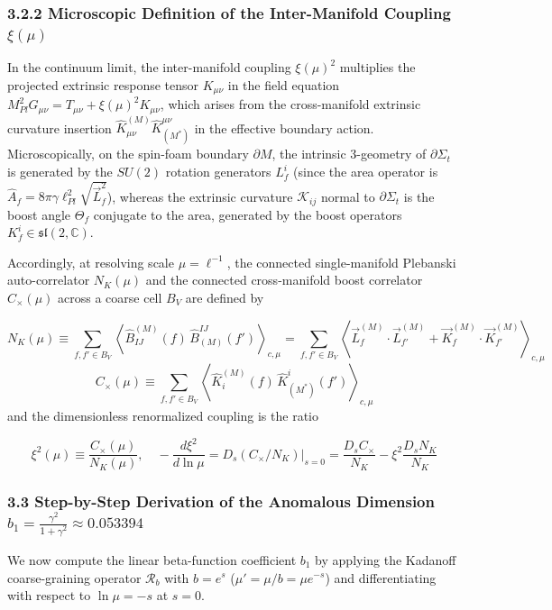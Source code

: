 \documentclass[aps,prd,onecolumn,superscriptaddress,nofootinbib,longbibliography,10pt]{revtex4-2}
\begin{document}
{{  
\subsubsection*{3.2.2 Microscopic Definition of the Inter-Manifold Coupling \(\xi(\mu)\)}

  In the continuum limit, the inter-manifold coupling \(\xi(\mu)^2\) multiplies the projected extrinsic response tensor \(K_{\mu\nu}\) in the field equation \(M_{Pl}^2 G_{\mu\nu} = T_{\mu\nu} + \xi(\mu)^2 K_{\mu\nu}\), which arises from the cross-manifold extrinsic curvature insertion \(\hat{K}_{\mu\nu}^{(M)}\hat{K}_{(M^*)}^{\mu\nu}\) in the effective boundary action. Microscopically, on the spin-foam boundary \(\partial M\), the intrinsic 3-geometry of \(\partial\Sigma_t\) is generated by the \(SU(2)\) rotation generators \(L_f^i\) (since the area operator is \(\hat{A}_f = 8\pi\gamma\ell_{Pl}^2\sqrt{\vec{L}_f^2}\)), whereas the extrinsic curvature \(\mathcal{K}_{ij}\) normal to \(\partial\Sigma_t\) is the boost angle \(\Theta_f\) conjugate to the area, generated by the boost operators \(K_f^i \in \mathfrak{sl}(2,\mathbb{C})\).


  Accordingly, at resolving scale \(\mu = \ell^{-1}\), the connected single-manifold Plebanski auto-correlator \(N_K(\mu)\) and the connected cross-manifold boost correlator \(C_\times(\mu)\) across a coarse cell \(B_V\) are defined by


  \[ N_K(\mu) \equiv \sum_{f,f'\in B_V} \left\langle \hat{B}_{IJ}^{(M)}(f)\,\hat{B}_{(M)}^{IJ}(f') \right\rangle_{c,\mu} = \sum_{f,f'\in B_V} \left\langle \vec{L}_f^{(M)}\cdot\vec{L}_{f'}^{(M)} + \vec{K}_f^{(M)}\cdot\vec{K}_{f'}^{(M)} \right\rangle_{c,\mu} \]
  \[ C_\times(\mu) \equiv \sum_{f,f'\in B_V} \left\langle \hat{K}_i^{(M)}(f)\,\hat{K}_{(M^*)}^i(f') \right\rangle_{c,\mu} \]
  and the dimensionless renormalized coupling is the ratio


  \[ \xi^2(\mu) \equiv \frac{C_\times(\mu)}{N_K(\mu)}, \quad -\frac{d\xi^2}{d\ln\mu} = \left. D_s(C_\times/N_K)\right|_{s=0} = \frac{D_s C_\times}{N_K} - \xi^2\frac{D_s N_K}{N_K} \]
  
  
\subsubsection*{3.3 Step-by-Step Derivation of the Anomalous Dimension \(b_1 = \frac{\gamma^2}{1+\gamma^2} \approx 0.053394\)}

  We now compute the linear beta-function coefficient \(b_1\) by applying the Kadanoff coarse-graining operator \(\mathcal{R}_b\) with \(b = e^s\) (\(\mu' = \mu/b = \mu e^{-s}\)) and differentiating with respect to \(\ln\mu = -s\) at \(s = 0\).


}}
\end{document}
